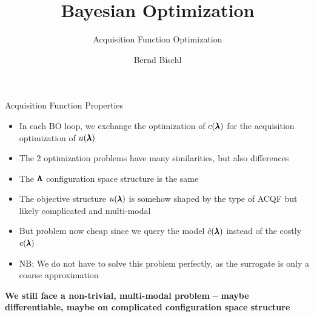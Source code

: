\documentclass[main]{subfiles}
\begin{document}
\title[AutoML: BO]{Bayesian Optimization}
\subtitle{Acquisition Function Optimization}
\author[Bernd Bischl]{Bernd Bischl}
\date{}


    \maketitle


\begin{frame}[t]{Acquisition Function Properties}
  \small
  \begin{itemize}
    \item In each BO loop, we exchange the optimization of $c(\pmb{\lambda})$ for the acquisition optimization
    of $u(\pmb{\lambda})$
    \item The 2 optimization problems have many similarities, but also differences
    \item The $\pmb{\Lambda}$ configuration space structure is the same
    \item The objective structure $u(\pmb{\lambda})$ is somehow shaped by the type of ACQF but likely 
    complicated and multi-modal
    \item But problem now cheap since we query the model $\hat{c}(\pmb{\lambda})$ instead of the costly $c(\pmb{\lambda})$
    \item NB: We do not have to solve this problem perfectly, as the surrogate is only a coarse approximation
  \end{itemize}
  \vspace{0.2cm}
  \begin{center}
  \textbf{We still face a non-trivial, multi-modal problem -- maybe differentiable, maybe on complicated 
  configuration space structure}
  \end{center}
\end{frame}
\end{document}

